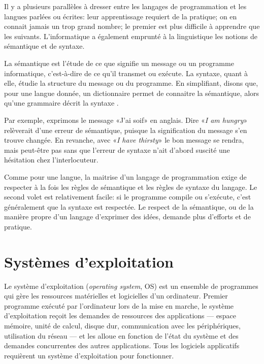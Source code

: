 Il y a plusieurs parallèles à dresser entre les langages de
programmation et les langues parlées ou écrites: leur apprentissage
requiert de la pratique; on en connait jamais un trop grand nombre; le
premier est plus difficile à apprendre que les suivants.
L'informatique a également emprunté à la linguistique les notions de
sémantique et de syntaxe.

La sémantique est l'étude de ce que signifie un message ou un
programme informatique, c'est-à-dire de ce qu'il transmet ou exécute.
La syntaxe, quant à elle, étudie la structure du message ou du
programme. En simplifiant, disons que, pour une langue donnée, un
dictionnaire permet de connaitre la sémantique, alors qu'une grammaire
décrit la syntaxe \citep{Hebenstreit:semantique}.

Par exemple, exprimons le message «J'ai soif» en anglais. Dire
«\emph{I am hungry}» relèverait d'une erreur de sémantique, puisque la
signification du message s'en trouve changée. En revanche, avec
«\emph{I have thirsty}» le bon message se rendra, mais peut-être pas
sans que l'erreur de syntaxe n'ait d'abord suscité une hésitation chez
l'interlocuteur.

Comme pour une langue, la maitrise d'un langage de programmation exige
de respecter à la fois les règles de sémantique et les règles de
syntaxe du langage. Le second volet est relativement facile: si le
programme compile ou s'exécute, c'est généralement que la syntaxe est
respectée. Le respect de la sémantique, ou de la manière propre d'un
langage d'exprimer des idées, demande plus d'efforts et de pratique.


\section{Systèmes d'exploitation}
\label{sec:informatique:os}

Le système d'exploitation
(\emph{operating system}, OS) est un ensemble de programmes qui gère
les ressources matérielles et logicielles d'un ordinateur. Premier
programme exécuté par l'ordinateur lors de la mise en marche, le
système d'exploitation reçoit les demandes de ressources des
applications --- espace mémoire, unité de calcul, disque dur,
communication avec les périphériques, utilisation du réseau --- et les
alloue en fonction de l'état du système et des demandes concurrentes
des autres applications. Tous les logiciels applicatifs requièrent un
système d'exploitation pour fonctionner.


